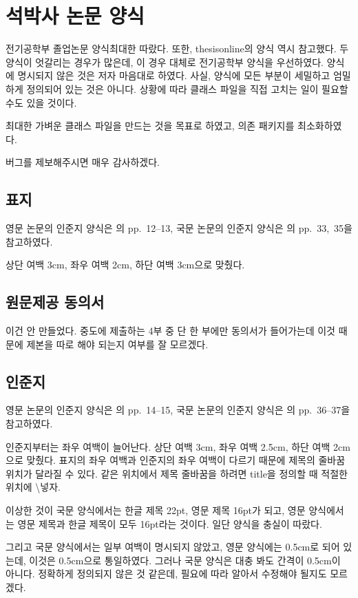 \documentclass[a4paper]{report}
\begin{document}
\chapter{석박사 논문 양식}

전기공학부 졸업논문 양식\cite{under,grad}\을 최대한 따랐다.
또한, thesisonline의 양식 역시 참고했다.
두 양식이 엇갈리는 경우가 많은데,
이 경우 대체로 전기공학부 양식을 우선하였다.
양식에 명시되지 않은 것은 저자 마음대로 하였다.
사실, 양식에 모든 부분이 세밀하고 엄밀하게
정의되어 있는 것은 아니다.
상황에 따라 클래스 파일을 직접 고치는 일이
필요할 수도 있을 것이다.

최대한 가벼운 클래스 파일을 만드는 것을
목표로 하였고, 의존 패키지를 최소화하였다.

버그를 제보해주시면 매우 감사하겠다.

\section{표지}
영문 논문의 인준지 양식은 \cite{grad}의 pp.~12--13,
국문 논문의 인준지 양식은 \cite{grad}의 pp.~33,~35을 참고하였다.

상단 여백 3cm, 좌우 여백 2cm, 하단 여백 3cm으로 맞췄다.

\section{원문제공 동의서}
이건 안 만들었다. 중도에 제출하는 4부 중 단 한 부에만
동의서가 들어가는데 이것 때문에 제본을 따로 해야
되는지 여부를 잘 모르겠다.

\section{인준지}
영문 논문의 인준지 양식은 \cite{grad}의 pp.~14--15,
국문 논문의 인준지 양식은 \cite{grad}의 pp.~36--37을 참고하였다.

인준지부터는 좌우 여백이 늘어난다.
상단 여백 3cm, 좌우 여백 2.5cm, 하단 여백 2cm으로 맞췄다.
표지의 좌우 여백과 인준지의 좌우 여백이 다르기 때문에
제목의 줄바꿈 위치가 달라질 수 있다.
같은 위치에서 제목 줄바꿈을 하려면 title을 정의할 때
적절한 위치에 \textbackslash{} 넣자.

이상한 것이 국문 양식에서는 한글 제목 22pt, 영문 제목 16pt가 되고,
영문 양식에서는 영문 제목과 한글 제목이 모두 16pt라는 것이다.
일단 양식을 충실이 따랐다.

그리고 국문 양식에서는 일부 여백이 명시되지 않았고,
영문 양식에는 0.5cm로 되어 있는데, 이것은 0.5cm으로 통일하였다.
그러나 국문 양식은 대충 봐도 간격이 0.5cm이 아니다.
정확하게 정의되지 않은 것 같은데, 필요에 따라
알아서 수정해야 될지도 모르겠다.
\end{document}
